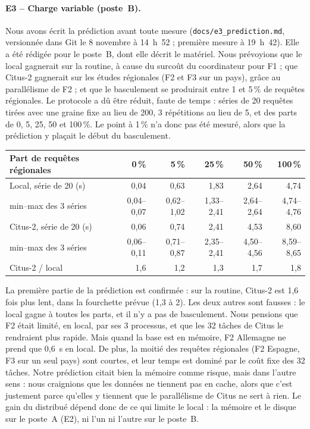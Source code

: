 \documentclass{rapportClass}
\newcommand{\cmd}[1]{\texttt{#1}}
\begin{document}
\paragraph{E3 -- Charge variable (poste~B).} Nous avons écrit la prédiction avant toute mesure
(\cmd{docs/e3\_prediction.md}, versionnée dans Git le 8 novembre à 14~h~52 ; première mesure à 19~h~42).
Elle a été rédigée pour le poste~B, dont elle décrit le matériel. Nous prévoyions que le local gagnerait sur la
routine, à cause du surcoût du coordinateur pour F1 ; que Citus-2 gagnerait sur les études régionales (F2 et F3 sur
un pays), grâce au parallélisme de F2 ; et que le basculement se produirait entre 1 et 5\,\% de requêtes régionales.
Le protocole a dû être réduit, faute de temps : séries de 20 requêtes
tirées avec une graine fixe au lieu de 200, 3 répétitions au lieu de 5, et des parts de 0, 5, 25, 50 et 100\,\%.
Le point à 1\,\% n'a donc pas été mesuré, alors que la prédiction y plaçait le début du basculement.
\begin{table}[H]
\centering\small
\begin{tabular}{lrrrrr}
\toprule
Part de requêtes régionales & 0\,\% & 5\,\% & 25\,\% & 50\,\% & 100\,\% \\
\midrule
Local, série de 20 (s) & 0,04 & 0,63 & 1,83 & 2,64 & 4,74 \\
\quad min--max des 3 séries & 0,04--0,07 & 0,62--1,02 & 1,33--2,41 & 2,64--2,64 & 4,74--4,76 \\
Citus-2, série de 20 (s) & 0,06 & 0,74 & 2,41 & 4,53 & 8,60 \\
\quad min--max des 3 séries & 0,06--0,11 & 0,71--0,87 & 2,35--2,41 & 4,50--4,56 & 8,59--8,65 \\
Citus-2 / local & 1,6 & 1,2 & 1,3 & 1,7 & 1,8 \\
\bottomrule
\end{tabular}
\end{table}
La première partie de la prédiction est confirmée : sur la routine, Citus-2 est 1,6 fois plus lent, dans la
fourchette prévue (1,3 à 2). Les deux autres sont fausses : le local gagne à toutes les parts, et il n'y a pas de
basculement. Nous pensions que F2 était limité, en local, par ses 3 processus, et que les 32 tâches de Citus le
rendraient plus rapide. Mais quand la base est en mémoire, F2 Allemagne ne prend que 0,6~s en local. De plus, la
moitié des requêtes régionales (F2 Espagne, F3 sur un seul pays) sont courtes, et leur temps est dominé par le
coût fixe des 32 tâches. Notre prédiction citait bien la mémoire comme risque, mais dans l'autre sens : nous
craignions que les données ne tiennent pas en cache, alors que c'est justement parce qu'elles y tiennent que le
parallélisme de Citus ne sert à rien.
Le gain du distribué dépend donc de ce qui limite le local : la mémoire et le disque sur le poste~A (E2),
ni l'un ni l'autre sur le poste~B.
\end{document}
